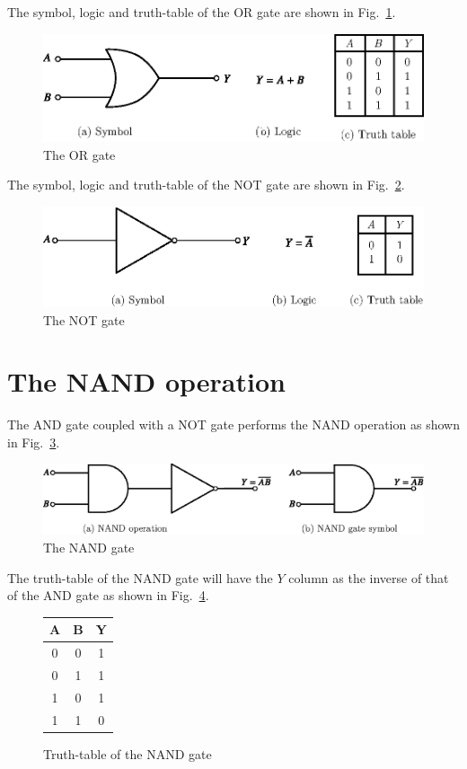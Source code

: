 The symbol, logic and truth-table of the OR gate are shown in Fig.~\ref{fig6.16}.
\begin{figure}[H]
\centering
\includegraphics{chap6/fig90_6.16a.eps}
\caption{The OR gate}\label{fig6.16}
\end{figure}

The symbol, logic and truth-table of the NOT gate are shown in Fig.~\ref{fig6.17}.
\begin{figure}[H]
\centering
\includegraphics{chap6/fig91_6.17a.eps}
\caption{The NOT gate}\label{fig6.17}
\end{figure}

\section{The NAND operation}\label{sec6.22}

The AND gate coupled with a NOT gate performs the NAND operation as shown in Fig.~\ref{fig6.18}.
\begin{figure}[H]
\centering
\includegraphics{chap6/fig92_6.18.eps}
\caption{The NAND gate}\label{fig6.18}
\end{figure}

The truth-table of the NAND gate will have the $Y$ column as the inverse of that of the AND gate as shown in Fig.~\ref{fig6.19}.
\begin{figure}[H]
\centering
\tabcolsep=8pt
\renewcommand{\arraystretch}{1.2}
\begin{tabular}{|cc|c|}
\hline
{\bf A} & {\bf B} & {\bf Y}\\
\hline
0 & 0 & 1\\
0 & 1 & 1\\
1 & 0 & 1\\
1 & 1 & 0\\
\hline
\end{tabular}
\caption{Truth-table of the NAND gate}\label{fig6.19}
\end{figure}

